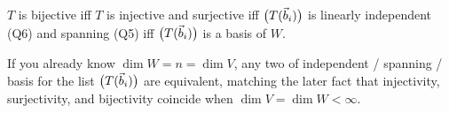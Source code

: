 \begin{coursebox}
$T$ is bijective iff $T$ is injective and surjective iff
$\bigl(T(\vec{b}_i)\bigr)$ is linearly independent (Q6) and spanning (Q5) iff
$\bigl(T(\vec{b}_i)\bigr)$ is a basis of $W$.
\end{coursebox}

\begin{laterbox}
If you already know $\dim W=n=\dim V$, any two of independent / spanning /
basis for the list $\bigl(T(\vec{b}_i)\bigr)$ are equivalent, matching the later
fact that injectivity, surjectivity, and bijectivity coincide when
$\dim V=\dim W<\infty$.
\end{laterbox}
